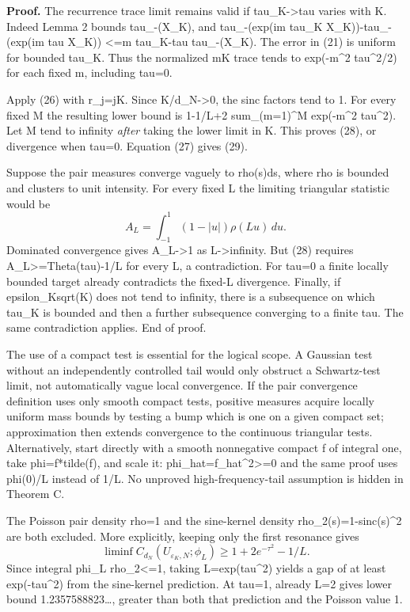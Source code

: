 \documentclass[11pt,a4paper]{article}
\begin{document}
\textbf{Proof.} The recurrence trace limit remains valid if tau\_K-\textgreater tau varies with K. Indeed Lemma 2 bounds tau\_-(\textbar X\_K\textbar), and \textbar tau\_-(exp(im tau\_K X\_K))-tau\_-(exp(im tau X\_K))\textbar{} \textless=\textbar m\textbar{} \textbar tau\_K-tau\textbar{} tau\_-(\textbar X\_K\textbar). The error in (21) is uniform for bounded tau\_K. Thus the normalized mK trace tends to exp(-m\^{}2 tau\^{}2/2) for each fixed m, including tau=0.

Apply (26) with r\_j=jK. Since K/d\_N-\textgreater0, the sinc factors tend to 1. For every fixed M the resulting lower bound is 1-1/L+2 sum\_(m=1)\^{}M exp(-m\^{}2 tau\^{}2). Let M tend to infinity \emph{after} taking the lower limit in K. This proves (28), or divergence when tau=0. Equation (27) gives (29).

Suppose the pair measures converge vaguely to rho(s)ds, where rho is bounded and clusters to unit intensity. For every fixed L the limiting triangular statistic would be \[
 A_L=\int_{-1}^1(1-|u|)\rho(Lu)\,du.
\] Dominated convergence gives A\_L-\textgreater1 as L-\textgreater infinity. But (28) requires A\_L\textgreater=Theta(tau)-1/L for every L, a contradiction. For tau=0 a finite locally bounded target already contradicts the fixed-L divergence. Finally, if \textbar epsilon\_K\textbar sqrt(K) does not tend to infinity, there is a subsequence on which tau\_K is bounded and then a further subsequence converging to a finite tau. The same contradiction applies. End of proof.

The use of a compact test is essential for the logical scope. A Gaussian test without an independently controlled tail would only obstruct a Schwartz-test limit, not automatically vague local convergence. If the pair convergence definition uses only smooth compact tests, positive measures acquire locally uniform mass bounds by testing a bump which is one on a given compact set; approximation then extends convergence to the continuous triangular tests. Alternatively, start directly with a smooth nonnegative compact f of integral one, take phi=f*tilde(f), and scale it: phi\_hat=\textbar f\_hat\textbar\^{}2\textgreater=0 and the same proof uses phi(0)/L instead of 1/L. No unproved high-frequency-tail assumption is hidden in Theorem C.

The Poisson pair density rho=1 and the sine-kernel density rho\_2(s)=1-sinc(s)\^{}2 are both excluded. More explicitly, keeping only the first resonance gives \[
 \liminf C_{d_N}(U_{\varepsilon_K,N};\phi_L)
        \geq1+2e^{-\tau^2}-1/L.                               \tag{31}
\] Since integral phi\_L rho\_2\textless=1, taking L=exp(tau\^{}2) yields a gap of at least exp(-tau\^{}2) from the sine-kernel prediction. At tau=1, already L=2 gives lower bound 1.2357588823\ldots, greater than both that prediction and the Poisson value 1.
\end{document}
